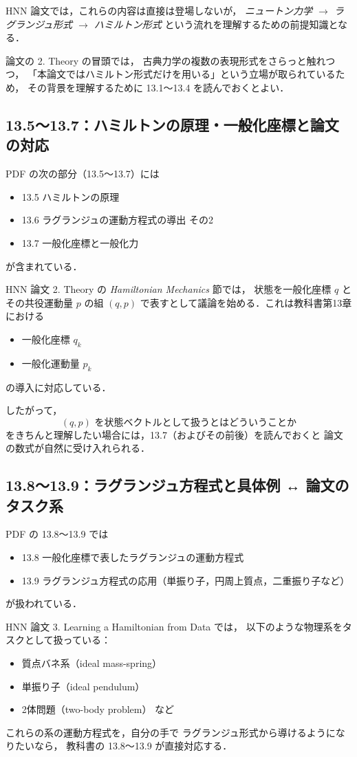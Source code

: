 \documentclass[a4paper,12pt]{jlreq}
\begin{document}
HNN 論文では，これらの内容は直接は登場しないが，
\emph{ニュートン力学 \(\to\) ラグランジュ形式 \(\to\) ハミルトン形式}
という流れを理解するための前提知識となる．

論文の 2. Theory の冒頭では，
古典力学の複数の表現形式をさらっと触れつつ，
「本論文ではハミルトン形式だけを用いる」という立場が取られているため，
その背景を理解するために 13.1～13.4 を読んでおくとよい．

\subsection*{13.5～13.7：ハミルトンの原理・一般化座標と論文の対応}

PDF の次の部分（13.5～13.7）には
\begin{itemize}
  \item 13.5 ハミルトンの原理
  \item 13.6 ラグランジュの運動方程式の導出 その2
  \item 13.7 一般化座標と一般化力
\end{itemize}
が含まれている．

HNN 論文 2. Theory の
\emph{Hamiltonian Mechanics} 節では，
状態を一般化座標 \(q\) とその共役運動量 \(p\) の組
\((q,p)\) で表すとして議論を始める．これは教科書第13章における
\begin{itemize}
  \item 一般化座標 \(q_k\)
  \item 一般化運動量 \(p_k\)
\end{itemize}
の導入に対応している．

したがって，
\[
  (q,p) \text{ を状態ベクトルとして扱うとはどういうことか}
\]
をきちんと理解したい場合には，13.7（およびその前後）を読んでおくと
論文の数式が自然に受け入れられる．

\subsection*{13.8～13.9：ラグランジュ方程式と具体例 ↔ 論文のタスク系}

PDF の 13.8～13.9 では
\begin{itemize}
  \item 13.8 一般化座標で表したラグランジュの運動方程式
  \item 13.9 ラグランジュ方程式の応用（単振り子，円周上質点，二重振り子など）
\end{itemize}
が扱われている．

HNN 論文 3. Learning a Hamiltonian from Data では，
以下のような物理系をタスクとして扱っている：
\begin{itemize}
  \item 質点バネ系（ideal mass-spring）
  \item 単振り子（ideal pendulum）
  \item 2体問題（two-body problem） など
\end{itemize}
これらの系の運動方程式を，自分の手で
ラグランジュ形式から導けるようになりたいなら，
教科書の 13.8～13.9 が直接対応する．
\end{document}
